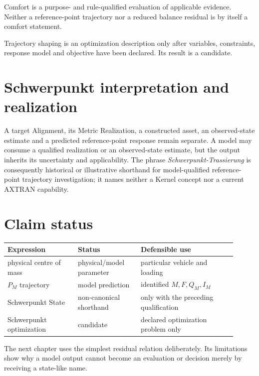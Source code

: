 \begin{definition}
\label{def:operational-comfort}
Comfort is a purpose- and rule-qualified evaluation of applicable evidence.
Neither a reference-point trajectory nor a reduced balance residual is by
itself a comfort statement.
\end{definition}

\begin{definition}
\label{def:trajectory-shaping}
Trajectory shaping is an optimization description only after variables,
constraints, response model and objective have been declared. Its result is a
candidate.
\end{definition}

\section{Schwerpunkt interpretation and realization}

A target Alignment, its Metric Realization, a constructed asset, an
observed-state estimate and a predicted reference-point response remain
separate. A model may consume a qualified realization or an observed-state
estimate, but the output inherits its uncertainty and applicability. The
phrase \emph{Schwerpunkt-Trassierung} is consequently historical or
illustrative shorthand for model-qualified reference-point trajectory
investigation; it names neither a Kernel concept nor a current AXTRAN
capability.

\section{Claim status}

\begin{center}
\small
\begin{tabular}{p{0.28\linewidth}p{0.25\linewidth}p{0.38\linewidth}}
\toprule
Expression & Status & Defensible use\\
\midrule
physical centre of mass & physical/model parameter & particular vehicle and loading\\
\(P_M\) trajectory & model prediction & identified \(M,F,Q_M,I_M\)\\
Schwerpunkt State & non-canonical shorthand & only with the preceding qualification\\
Schwerpunkt optimization & candidate & declared optimization problem only\\
\bottomrule
\end{tabular}
\end{center}

The next chapter uses the simplest residual relation deliberately. Its
limitations show why a model output cannot become an evaluation or decision
merely by receiving a state-like name.

